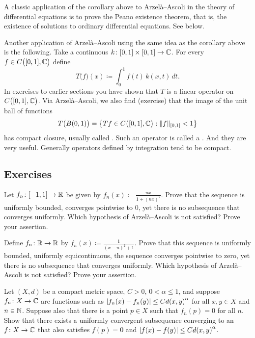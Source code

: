 A classic application of the corollary above to Arzel\`a--Ascoli
in the theory of differential
equations is to prove the Peano existence
theorem, that is, the existence of solutions to ordinary differential
equations.  See  below.

\medskip

Another application of Arzel\`a--Ascoli using the same idea as the
corollary above is the following.
Take a continuous $k \colon [0,1] \times [0,1] \to {\mathbb{C}}$.
For every $f \in C\bigl([0,1],{\mathbb{C}}\bigr)$ define
\begin{equation*}
T\bigl(f\bigr)(x) \coloneqq  \int_0^1 f(t) \, k(x,t)\,dt .
\end{equation*}
In exercises to earlier sections you have shown that 
$T$ is a linear operator on $C\bigl([0,1],{\mathbb{C}}\bigr)$.
Via Arzel\`a--Ascoli, we also find (exercise) that
the image of the unit ball of functions
\begin{equation*}
T\bigl( B(0,1) \bigr) = 
\bigl\{
Tf \in C\bigl([0,1],{\mathbb{C}}\bigr) :  
\lVert {f} \rVert_{[0,1]} < 1
\bigr\}
\end{equation*}
has compact closure, usually called
\emph{}.
Such an operator is called a \emph{}.
And they are very useful.  Generally operators defined by
integration tend to be compact.

\subsection{Exercises}

\begin{exercise}
Let $f_n \colon [-1,1] \to {\mathbb{R}}$ be given by $f_n(x) \coloneqq \frac{nx}{1+{(nx)}^2}$.
Prove that the sequence is uniformly bounded, converges pointwise to 0,
yet there is no
subsequence that converges uniformly.
Which hypothesis of Arzel\`a--Ascoli
is not satisfied?  Prove your assertion.
\end{exercise}

\begin{exercise}
Define $f_n \colon {\mathbb{R}} \to {\mathbb{R}}$ by $f_n(x) \coloneqq \frac{1}{{(x-n)}^2+1}$.  Prove that
this sequence is uniformly bounded, uniformly equicontinuous, the sequence
converges pointwise to zero, yet there is no
subsequence that converges uniformly.
Which hypothesis of Arzel\`a--Ascoli
is not satisfied?  Prove your assertion.
\end{exercise}

\begin{exercise}
Let $(X,d)$ be a compact metric space, $C > 0$, $0 < \alpha \leq 1$, and
suppose $f_n \colon X \to {\mathbb{C}}$ are functions such as
$\left\lvert {f_n(x)-f_n(y)} \right\rvert \leq C {d(x,y)}^\alpha$ for all $x,y \in X$ and
$n \in {\mathbb{N}}$.  Suppose also that there is a point $p \in X$ such that
$f_n(p) = 0$ for all $n$.
Show that there exists a uniformly convergent subsequence converging to
an $f \colon X \to {\mathbb{C}}$ that also satisfies $f(p) = 0$ and
$\left\lvert {f(x)-f(y)} \right\rvert \leq C {d(x,y)}^\alpha$.
\end{exercise}


